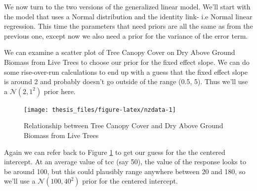 \documentclass[12pt,twoside]{reedthesis}
\begin{document}
We now turn to the two versions of the generalized linear model. We'll start with the model that uses a Normal distribution and the identity link- i.e Normal linear regression. This time the parameters that need priors are all the same as from the previous one, except now we also need a prior for the variance of the error term.

We can examine a scatter plot of Tree Canopy Cover on Dry Above Ground Biomass from Live Trees to choose our prior for the fixed effect slope. We can do some rise-over-run calculations to end up with a guess that the fixed effect slope is around 2 and probably doesn't go outside of the range (0.5, 5). Thus we'll use a \(\mathcal{N}(2, 1^2)\) prior here.
\begin{figure}

{\centering \texttt{[image: thesis\_files/figure-latex/nzdata-1]} 

}

\caption{Relationship between Tree Canopy Cover and Dry Above Ground Biomass from Live Trees}\label{fig:nzdata}
\end{figure}
Again we can refer back to Figure \ref{fig:nzdata} to get our guess for the the centered intercept. At an average value of tcc (say 50), the value of the response looks to be around 100, but this could plausibly range anywhere between 20 and 180, so we'll use a \(\mathcal{N}(100, 40^2)\) prior for the centered intercept.
\end{document}
